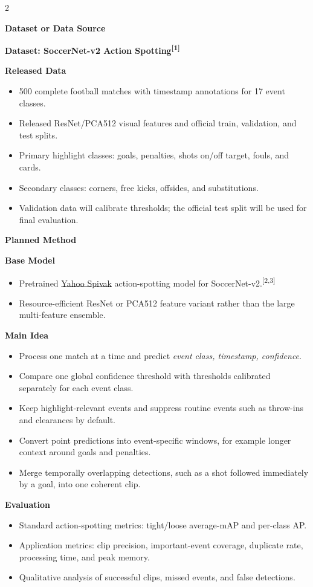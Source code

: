 \documentclass[10pt,a4paper]{article}
\newcommand{\sectiontitle}[1]{%
  \vspace{4pt}\par{\fontsize{15}{17}\selectfont\bfseries #1}\par\vspace{3pt}%
}
\newcommand{\subsectiontitle}[1]{%
  \vspace{2pt}\par{\fontsize{11.5}{13}\selectfont\bfseries #1}\par\vspace{1pt}%
}
\begin{document}
\begin{multicols}{2}
\sectiontitle{Dataset or Data Source}

\textbf{Dataset: SoccerNet-v2 Action Spotting\textsuperscript{[1]}}

\subsectiontitle{Released Data}
\begin{itemize}
  \item 500 complete football matches with timestamp annotations for 17 event classes.
  \item Released ResNet/PCA512 visual features and official train, validation, and test splits.
  \item Primary highlight classes: goals, penalties, shots on/off target, fouls, and cards.
  \item Secondary classes: corners, free kicks, offsides, and substitutions.
  \item Validation data will calibrate thresholds; the official test split will be used for final evaluation.
\end{itemize}

\columnbreak

\sectiontitle{Planned Method}

\subsectiontitle{Base Model}
\begin{itemize}
  \item Pretrained \href{https://github.com/yahoo/spivak}{Yahoo Spivak} action-spotting model for SoccerNet-v2.\textsuperscript{[2,3]}
  \item Resource-efficient ResNet or PCA512 feature variant rather than the large multi-feature ensemble.
\end{itemize}

\subsectiontitle{Main Idea}
\begin{itemize}
  \item Process one match at a time and predict \textit{event class, timestamp, confidence}.
  \item Compare one global confidence threshold with thresholds calibrated separately for each event class.
  \item Keep highlight-relevant events and suppress routine events such as throw-ins and clearances by default.
  \item Convert point predictions into event-specific windows, for example longer context around goals and penalties.
  \item Merge temporally overlapping detections, such as a shot followed immediately by a goal, into one coherent clip.
\end{itemize}

\subsectiontitle{Evaluation}
\begin{itemize}
  \item Standard action-spotting metrics: tight/loose average-mAP and per-class AP.
  \item Application metrics: clip precision, important-event coverage, duplicate rate, processing time, and peak memory.
  \item Qualitative analysis of successful clips, missed events, and false detections.
\end{itemize}


\end{multicols}
\end{document}
